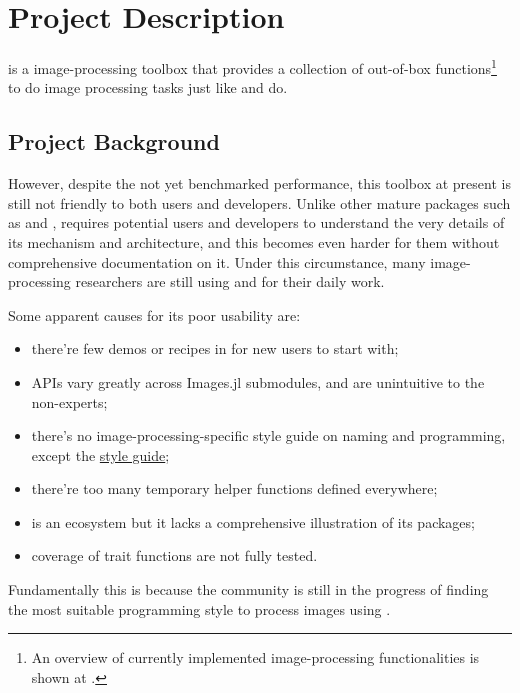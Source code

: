 
\section{Project Description}\label{sec:project}

\repoimages{} is a \langjulia image-processing toolbox that provides a collection of out-of-box functions\footnote{An overview of currently implemented image-processing functionalities is shown at \apicomparison.} to do image processing tasks just like \reposcikitimage{} and \matlabimageprocessing{} do.

\subsection*{Project Background}

However, despite the not yet benchmarked performance, this toolbox at present is still not friendly to both users and developers. Unlike other mature \langjulia{} packages such as \repojump and \repogpuarrays, \images{} requires potential users and developers to understand the very details of its mechanism and architecture, and this becomes even harder for them without comprehensive documentation on it. Under this circumstance, many image-processing researchers are still using \langpython and \langmatlab for their daily work.

Some apparent causes for its poor usability are:
\begin{itemize}
    \item there're few demos or recipes in \images{} for new users to start with;
    \item APIs vary greatly across Images.jl submodules, and are unintuitive to the non-experts;
    \item there's no image-processing-specific style guide on naming and programming, except the \langjulia{} \href{https://docs.julialang.org/en/v1/manual/style-guide/}{style guide};
    \item there're too many temporary helper functions defined everywhere;
    \item \images{} is an ecosystem but it lacks a comprehensive illustration of its packages;
    \item coverage of trait functions are not fully tested.
\end{itemize}
Fundamentally this is because the community is still in the progress of finding the most suitable programming style to process images using \langjulia.

